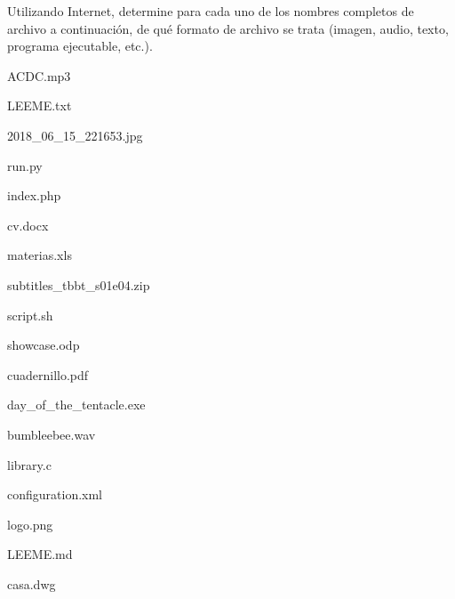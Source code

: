 \begin{exercise}
Utilizando Internet, determine para cada uno de los nombres completos de
archivo a continuación, de qué formato de archivo se trata (imagen, audio, texto,
programa ejecutable, etc.).

\begin{enumerate}[a)]
    \begin{minipage}{0.45\textwidth}
        \item ACDC.mp3
        \item LEEME.txt
        \item 2018\_06\_15\_221653.jpg
        \item run.py
        \item index.php
        \item cv.docx
        \item materias.xls
        \item subtitles\_tbbt\_s01e04.zip
        \item script.sh
    \end{minipage}
    \begin{minipage}{0.45\textwidth}
        \item showcase.odp
        \item cuadernillo.pdf
        \item day\_of\_the\_tentacle.exe
        \item bumbleebee.wav
        \item library.c
        \item configuration.xml
        \item logo.png
        \item LEEME.md
        \item casa.dwg
    \end{minipage}
\end{enumerate}

\end{exercise}

